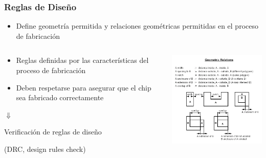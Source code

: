 \documentclass[aspectratio=169,10pt]{beamer}
\begin{document}
\begin{frame}[t]
\frametitle{Reglas de Diseño}
\begin{itemize}
	\item Define geometría permitida y relaciones geométricas permitidas en el proceso de fabricación
\end{itemize}

\begin{columns}
	\begin{column}{0.4\textwidth}
	\begin{itemize}
		\item Reglas definidas por las características del proceso de fabricación
		\item Deben respetarse para asegurar que el chip sea fabricado correctamente
	\end{itemize}
	
	\centering
	\vspace{3mm}
	$\Downarrow$
	\vspace{3mm}
	\begin{tcolorbox}[colframe=red,colback=white]
		\centering
		Verificación de reglas de diseño
		
		(DRC, design rules check)
	\end{tcolorbox}
	\end{column}
	\begin{column}{0.6\textwidth}
		\centering
		\includegraphics[width=7cm]{DRC}
	\end{column}
\end{columns}
\end{frame}
\end{document}
